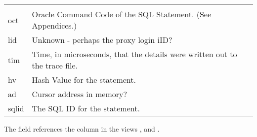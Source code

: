 \begin{longtable}[]{@{}l|l@{}}
\begin{minipage}[t]{0.65\columnwidth}
\end{minipage}\tabularnewline
\begin{minipage}[t]{0.14\columnwidth}\raggedright\strut
oct\strut
\end{minipage} & \begin{minipage}[t]{0.65\columnwidth}\raggedright\strut
Oracle Command Code of the SQL Statement. (See Appendices.)\strut
\end{minipage}\tabularnewline
\begin{minipage}[t]{0.14\columnwidth}\raggedright\strut
lid\strut
\end{minipage} & \begin{minipage}[t]{0.65\columnwidth}\raggedright\strut
Unknown - perhaps the proxy login iID?\strut
\end{minipage}\tabularnewline
\begin{minipage}[t]{0.14\columnwidth}\raggedright\strut
tim\strut
\end{minipage} & \begin{minipage}[t]{0.65\columnwidth}\raggedright\strut
Time, in microseconds, that the details were written out to the trace file.\strut
\end{minipage}\tabularnewline
\begin{minipage}[t]{0.14\columnwidth}\raggedright\strut
hv\strut
\end{minipage} & \begin{minipage}[t]{0.65\columnwidth}\raggedright\strut
Hash Value for the statement.\strut
\end{minipage}\tabularnewline
\begin{minipage}[t]{0.14\columnwidth}\raggedright\strut
ad\strut
\end{minipage} & \begin{minipage}[t]{0.65\columnwidth}\raggedright\strut
Cursor address in memory?\strut
\end{minipage}\tabularnewline
\begin{minipage}[t]{0.14\columnwidth}\raggedright\strut
sqlid\strut
\end{minipage} & \begin{minipage}[t]{0.65\columnwidth}\raggedright\strut
The SQL ID for the statement.\strut
\end{minipage}\tabularnewline
\bottomrule
\end{longtable}

The  field references the column  in the views ,  and .

